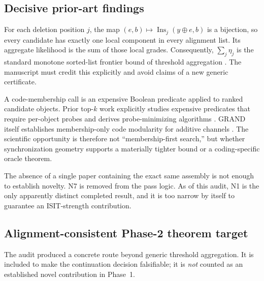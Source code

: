 \documentclass[11pt]{article}
\theoremstyle{definition}
\theoremstyle{remark}
\newcommand{\Ins}{\operatorname{Ins}}
\begin{document}
\subsection{Decisive prior-art findings}

\begin{stopbox}
For each deletion position $j$, the map $(e,b)\mapsto\Ins_j(y\oplus e,b)$ is a bijection, so every candidate has exactly one local component in every alignment list. Its aggregate likelihood is the sum of those local grades. Consequently, $\sum_j\eta_j$ is the standard monotone sorted-list frontier bound of threshold aggregation \cite{fagin2003ta}. The manuscript must credit this explicitly and avoid claims of a new generic certificate.
\end{stopbox}

\begin{stopbox}
A code-membership call is an expensive Boolean predicate applied to ranked candidate objects. Prior top-$k$ work explicitly studies expensive predicates that require per-object probes and derives probe-minimizing algorithms \cite{chang2002mpro}. GRAND itself establishes membership-only code modularity for additive channels \cite{duffy2019grand}. The scientific opportunity is therefore not ``membership-first search,'' but whether synchronization geometry supports a materially tighter bound or a coding-specific oracle theorem.
\end{stopbox}

\begin{stopbox}
The absence of a single paper containing the exact same assembly is not enough to establish novelty. N7 is removed from the pass logic. As of this audit, N1 is the only apparently distinct completed result, and it is too narrow by itself to guarantee an ISIT-strength contribution.
\end{stopbox}

\subsection{Alignment-consistent Phase-2 theorem target}
\label{sec:ac-target}

The audit produced a concrete route beyond generic threshold aggregation. It is included to make the continuation decision falsifiable; it is \emph{not} counted as an established novel contribution in Phase~1.
\end{document}
